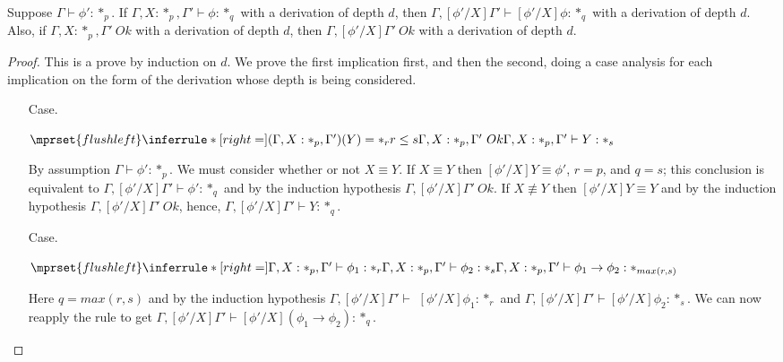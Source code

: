 \begin{lemma}
  Suppose $\Gamma \vdash \phi':*_p$.  If $\Gamma,X:*_p,\Gamma' \vdash \phi:*_q$ 
  with a derivation of depth $d$, then $\Gamma,[\phi'/X]\Gamma' \vdash [\phi'/X]\phi:*_q$
  with a derivation of depth $d$.
  Also, if $\Gamma,X:*_p,\Gamma'\ Ok$ with a derivation of depth $d$, then 
  $\Gamma,[\phi'/X]\Gamma'\ Ok$ with a derivation of depth $d$.
  \label{lemma:substitution_for_kinding_ssf}
\end{lemma}
\begin{proof}
  This is a prove by induction on $d$.  We prove the first implication first, and then the 
  second, doing a case analysis for each implication on the form of the derivation whose depth 
  is being considered. 

  \begin{itemize}
  \item[Case.]\ \\
    \begin{center}
      \begin{math}
        $$\mprset{flushleft}
        \inferrule* [right=] {
          (\Gamma,X:*_p,\Gamma')(Y) = *_r
          \\
          r \leq s
          \\
          \Gamma,X:*_p,\Gamma'\ Ok
        }{\Gamma,X:*_p,\Gamma' \vdash Y : *_s}
      \end{math}
    \end{center}
    By assumption $\Gamma \vdash \phi':*_p$.  We must consider whether or not 
    $X \equiv Y$.  If $X \equiv Y$ then $[\phi'/X]Y \equiv \phi'$, $r = p$, and $q = s$; 
    this conclusion is equivalent to $\Gamma,[\phi'/X]\Gamma' \vdash \phi':*_q$ and
    by the induction hypothesis $\Gamma,[\phi'/X]\Gamma'\ Ok$.  
    If $X \not \equiv Y$ then $[\phi'/X]Y \equiv Y$ and 
    by the induction hypothesis $\Gamma,[\phi'/X]\Gamma'\ Ok$, hence,
    $\Gamma,[\phi'/X]\Gamma' \vdash Y:*_q$.\\
    
  \item[Case.]\ \\
    \begin{center}
      \begin{math}
        $$\mprset{flushleft}
        \inferrule* [right=] {
          \Gamma,X:*_p,\Gamma' \vdash \phi_1 : *_r
          \\
          \Gamma,X:*_p,\Gamma' \vdash \phi_2 : *_s
        }{\Gamma,X:*_p,\Gamma' \vdash \phi_1 \rightarrow \phi_2 : *_{max(r,s)}}
      \end{math}
    \end{center}
    Here $q = max(r,s)$ and by the induction hypothesis $\Gamma,[\phi'/X]\Gamma' \vdash $
    $[\phi'/X]\phi_1:*_r$ and $\Gamma,[\phi'/X]\Gamma' \vdash [\phi'/X]\phi_2:*_s$.
    We can now reapply the rule to get 
    $\Gamma,[\phi'/X]\Gamma' \vdash [\phi'/X](\phi_1 \rightarrow \phi_2) : *_q$.\\
    

\end{itemize}
\end{proof}

